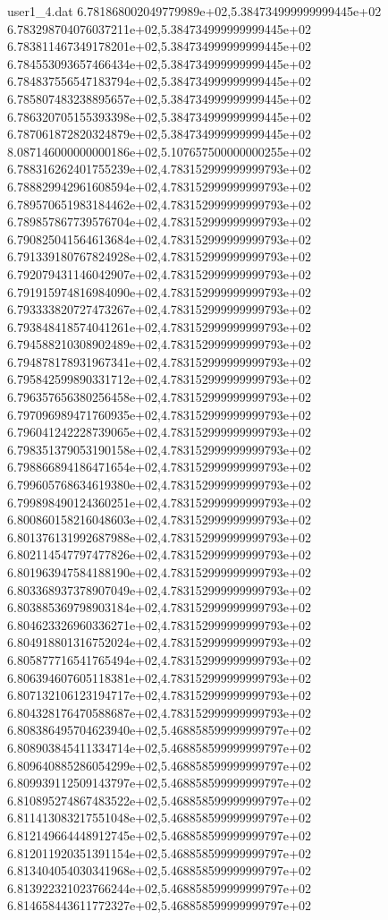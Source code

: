 \begin{filecontents}{user1_4.dat}
6.781868002049779989e+02,5.384734999999999445e+02
6.783298704076037211e+02,5.384734999999999445e+02
6.783811467349178201e+02,5.384734999999999445e+02
6.784553093657466434e+02,5.384734999999999445e+02
6.784837556547183794e+02,5.384734999999999445e+02
6.785807483238895657e+02,5.384734999999999445e+02
6.786320705155393398e+02,5.384734999999999445e+02
6.787061872820324879e+02,5.384734999999999445e+02
8.087146000000000186e+02,5.107657500000000255e+02
6.788316262401755239e+02,4.783152999999999793e+02
6.788829942961608594e+02,4.783152999999999793e+02
6.789570651983184462e+02,4.783152999999999793e+02
6.789857867739576704e+02,4.783152999999999793e+02
6.790825041564613684e+02,4.783152999999999793e+02
6.791339180767824928e+02,4.783152999999999793e+02
6.792079431146042907e+02,4.783152999999999793e+02
6.791915974816984090e+02,4.783152999999999793e+02
6.793333820727473267e+02,4.783152999999999793e+02
6.793848418574041261e+02,4.783152999999999793e+02
6.794588210308902489e+02,4.783152999999999793e+02
6.794878178931967341e+02,4.783152999999999793e+02
6.795842599890331712e+02,4.783152999999999793e+02
6.796357656380256458e+02,4.783152999999999793e+02
6.797096989471760935e+02,4.783152999999999793e+02
6.796041242228739065e+02,4.783152999999999793e+02
6.798351379053190158e+02,4.783152999999999793e+02
6.798866894186471654e+02,4.783152999999999793e+02
6.799605768634619380e+02,4.783152999999999793e+02
6.799898490124360251e+02,4.783152999999999793e+02
6.800860158216048603e+02,4.783152999999999793e+02
6.801376131992687988e+02,4.783152999999999793e+02
6.802114547797477826e+02,4.783152999999999793e+02
6.801963947584188190e+02,4.783152999999999793e+02
6.803368937378907049e+02,4.783152999999999793e+02
6.803885369798903184e+02,4.783152999999999793e+02
6.804623326960336271e+02,4.783152999999999793e+02
6.804918801316752024e+02,4.783152999999999793e+02
6.805877716541765494e+02,4.783152999999999793e+02
6.806394607605118381e+02,4.783152999999999793e+02
6.807132106123194717e+02,4.783152999999999793e+02
6.804328176470588687e+02,4.783152999999999793e+02
6.808386495704623940e+02,5.468858599999999797e+02
6.808903845411334714e+02,5.468858599999999797e+02
6.809640885286054299e+02,5.468858599999999797e+02
6.809939112509143797e+02,5.468858599999999797e+02
6.810895274867483522e+02,5.468858599999999797e+02
6.811413083217551048e+02,5.468858599999999797e+02
6.812149664448912745e+02,5.468858599999999797e+02
6.812011920351391154e+02,5.468858599999999797e+02
6.813404054030341968e+02,5.468858599999999797e+02
6.813922321023766244e+02,5.468858599999999797e+02
6.814658443611772327e+02,5.468858599999999797e+02

\end{filecontents}
